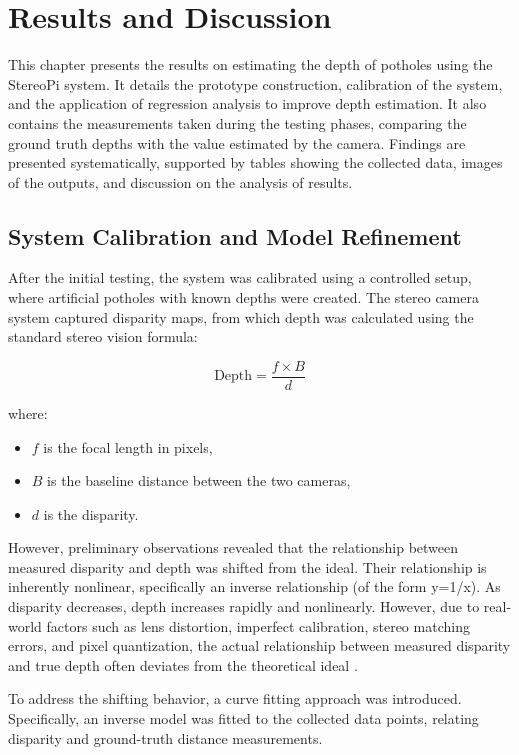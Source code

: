 \chapter{Results and Discussion}
This chapter presents the results on estimating the depth of potholes using the StereoPi system. It details the prototype construction, calibration of the system, and the application of regression analysis to improve depth estimation. It also contains the measurements taken during the testing phases, comparing the ground truth depths with the value estimated by the camera. Findings are presented systematically, supported by tables showing the collected data, images of the outputs, and discussion on the analysis of results.

\section{System Calibration and Model Refinement}
After the initial testing, the system was calibrated using a controlled setup, where artificial potholes with known depths were created. The stereo camera system captured disparity maps, from which depth was calculated using the standard stereo vision formula:

\[
\text{Depth} = \frac{f \times B}{d}
\]

where:
\begin{itemize}
	\item \( f \) is the focal length in pixels,
	\item \( B \) is the baseline distance between the two cameras,
	\item \( d \) is the disparity.
\end{itemize}


However, preliminary observations revealed that the relationship between measured disparity and depth was shifted from the ideal. Their relationship is inherently nonlinear, specifically an inverse relationship (of the form y=1/x). As disparity decreases, depth increases rapidly and nonlinearly. However, due to real-world factors such as lens distortion, imperfect calibration, stereo matching errors, and pixel quantization, the actual relationship between measured disparity and true depth often deviates from the theoretical ideal \cite{scharstein2002}.

To address the shifting behavior, a curve fitting approach was introduced. Specifically, an inverse model was fitted to the collected data points, relating disparity and ground-truth distance measurements.

